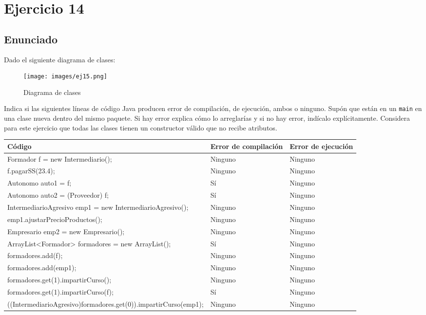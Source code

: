 \documentclass[a4paper,12pt]{article}
\begin{document}
\section{Ejercicio 14}

\subsection{Enunciado}

Dado el siguiente diagrama de clases:
\begin{figure}[H]
    \centering
    \texttt{[image: images/ej15.png]}
    \caption{Diagrama de clases}
    \label{fig:ejercicio15}
\end{figure}


Indica si las siguientes líneas de código Java producen error de compilación, de ejecución, ambos o ninguno. Supón que están en un \texttt{main} en una clase nueva dentro del mismo paquete. Si hay error explica cómo lo arreglarías y si no hay error, indícalo explícitamente. Considera para este ejercicio que todas las clases tienen un constructor válido que no recibe atributos.

\begin{table}[H]
    \centering
    \begin{tabular}{|l|p{2.5cm}|p{2cm}|}
        \hline
        \textbf{Código} & \textbf{Error de compilación} & \textbf{Error de ejecución} \\ \hline
        Formador f = new Intermediario(); & Ninguno & Ninguno \\ \hline
        f.pagarSS(23.4); & Ninguno & Ninguno \\ \hline
        Autonomo auto1 = f; & Sí & Ninguno \\ \hline
        Autonomo auto2 = (Proveedor) f; & Sí & Ninguno \\ \hline
        IntermediarioAgresivo emp1 = new IntermediarioAgresivo(); & Ninguno & Ninguno \\ \hline
        emp1.ajustarPrecioProductos(); & Ninguno & Ninguno \\ \hline
        Empresario emp2 = new Empresario(); & Ninguno & Ninguno \\ \hline
        ArrayList<Formador> formadores = new ArrayList(); & Sí & Ninguno \\ \hline
        formadores.add(f); & Ninguno & Ninguno \\ \hline
        formadores.add(emp1); & Ninguno & Ninguno \\ \hline
        formadores.get(1).impartirCurso(); & Ninguno & Ninguno \\ \hline
        formadores.get(1).impartirCurso(f); & Sí & Ninguno \\ \hline
        ((IntermediarioAgresivo)formadores.get(0)).impartirCurso(emp1); & Ninguno & Ninguno \\ \hline
    \end{tabular}
\end{table}
\end{document}
